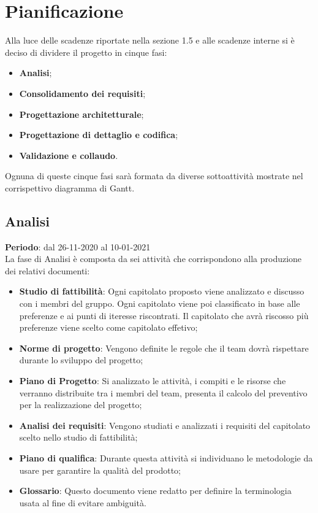 \section{Pianificazione}
	Alla luce delle scadenze riportate nella sezione 1.5 e alle scadenze interne si è deciso di dividere il progetto in cinque fasi:
	\begin{itemize}
		\item \textbf{Analisi};
		\item \textbf{Consolidamento dei requisiti};
		\item \textbf{Progettazione architetturale};
		\item \textbf{Progettazione di dettaglio e codifica};
		\item \textbf{Validazione e collaudo}.
	\end{itemize}
	Ognuna di queste cinque fasi sarà formata da diverse sottoattività mostrate nel corrispettivo diagramma di Gantt.

	\subsection{Analisi}
	\textbf{Periodo}: dal 26-11-2020 al 10-01-2021 \\
	La fase di Analisi è composta da sei attività che corrispondono alla produzione dei relativi documenti:
	\begin{itemize}
		\item \textbf{Studio di fattibilità}: Ogni capitolato proposto viene analizzato e discusso con i membri del gruppo. Ogni capitolato viene poi classificato in base alle preferenze e ai punti di iteresse riscontrati. Il capitolato che avrà riscosso più preferenze viene scelto come capitolato effetivo;
		\item \textbf{Norme di progetto}: Vengono definite le regole che il team dovrà rispettare durante lo sviluppo del progetto;
		\item \textbf{Piano di Progetto}: Si analizzato le attività, i compiti e le risorse che verranno distribuite tra i membri del team, presenta il calcolo del preventivo per la realizzazione del progetto;
		\item \textbf{Analisi dei requisiti}: Vengono studiati e analizzati i requisiti del capitolato scelto nello studio di fattibilità;
		\item \textbf{Piano di qualifica}: Durante questa attività si individuano le metodologie da usare per garantire la qualità del prodotto;
		\item \textbf{Glossario}: Questo documento viene redatto per definire la terminologia usata al fine di evitare ambiguità.
	\end{itemize}

